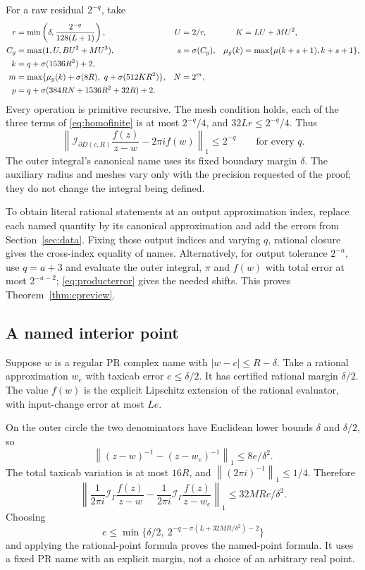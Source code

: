 \documentclass[11pt]{article}
\theoremstyle{definition}
\newcommand{\norm}[1]{\left\lVert#1\right\rVert_1}
\newcommand{\Int}{\mathcal I}
\begin{document}
For a raw residual \(2^{-q}\), take
\begin{align}
 r&=\min\left(\delta,\frac{2^{-q}}{128(L+1)}\right),&
 U&=2/r,&K&=LU+MU^2,\label{eq:cs1}\\
 C_g&=\max(1,U,BU^2+MU^3),&
 s&=\sigma(C_g),&
 \mu_g(k)&=\max\{\mu(k+s+1),k+s+1\},\notag\\
 k&=q+\sigma(1536R^2)+2,\notag\\
 m&=\max\{\mu_g(k)+\sigma(8R),\
                        q+\sigma(512KR^2)\},&
 N&=2^m,\label{eq:cs2}\\
 p&=q+\sigma(384RN+1536R^2+32R)+2.\label{eq:cs3}
\end{align}
Every operation is primitive recursive. The mesh condition holds, each
of the three terms of \eqref{eq:homofinite} is at most \(2^{-q}/4\),
and \(32Lr\le2^{-q}/4\). Thus
\begin{equation}\label{eq:crates}
 \norm{\Int_{\partial D(c,R)}\frac{f(z)}{z-w}-2\pi i f(w)}
       \le2^{-q}\qquad\text{for every }q.
\end{equation}
The outer integral's canonical name uses its fixed boundary margin
\(\delta\). The auxiliary radius and meshes vary only with the precision
requested of the proof; they do not change the integral being defined.

To obtain literal rational statements at an output approximation index,
replace each named quantity by its canonical approximation and add the
errors from Section~\ref{sec:data}. Fixing those output indices and
varying \(q\), rational closure gives the cross-index equality of names.
Alternatively, for output tolerance \(2^{-a}\), use \(q=a+3\) and
evaluate the outer integral, \(\pi\) and \(f(w)\) with total error at most
\(2^{-a-2}\); \eqref{eq:producterror} gives the needed shifts.
This proves Theorem~\ref{thm:cpreview}.

\subsection{A named interior point}

Suppose \(w\) is a regular PR complex name with \(|w-c|\le R-\delta\).
Take a rational approximation \(w_e\) with taxicab error
\(e\le\delta/2\). It has certified rational margin \(\delta/2\).
The value \(f(w)\) is the explicit Lipschitz extension of the rational
evaluator, with input-change error at most \(Le\).

On the outer circle the two denominators have Euclidean lower bounds
\(\delta\) and \(\delta/2\), so
\[
 \norm{(z-w)^{-1}-(z-w_e)^{-1}}\le8e/\delta^2.
\]
The total taxicab variation is at most \(16R\), and
\(\norm{(2\pi i)^{-1}}\le1/4\). Therefore
\begin{equation}\label{eq:wextension}
 \norm{\frac1{2\pi i}\Int_\Gamma\frac{f(z)}{z-w}
       -\frac1{2\pi i}\Int_\Gamma\frac{f(z)}{z-w_e}}
       \le32MR e/\delta^2.
\end{equation}
Choosing
\[
 e\le\min\{\delta/2,\
     2^{-q-\sigma(L+32MR/\delta^2)-2}\}
\]
and applying the rational-point formula proves the named-point formula.
It uses a fixed PR name with an explicit margin, not a choice of an
arbitrary real point.
\end{document}
